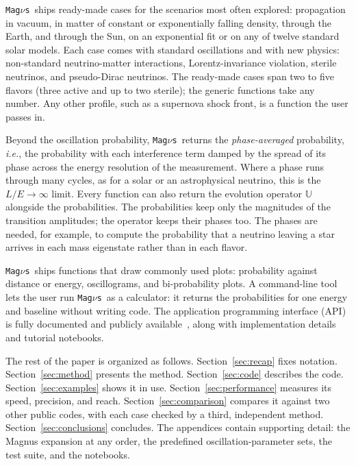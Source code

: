 \documentclass[final,5p,times,twocolumn,sort,compress]{elsarticle}
\makeatletter
\newcommand{\ie}{{\it i.e.}}
\DeclareRobustCommand{\_}{%
  \ifmmode\nfss@text{\textunderscore}\else\textunderscore\allowbreak\fi}
\newcommand{\magnus}{{\tt Mag}\ensuremath{\nu}{\tt s}}
\makeatother
\begin{document}
\magnus\ ships ready-made cases for the scenarios most often explored: propagation in vacuum, in matter of constant or exponentially falling density, through the Earth, and through the Sun, on an exponential fit or on any of twelve standard solar models. Each case comes with standard oscillations and with new physics: non-standard neutrino-matter interactions, Lorentz-invariance violation, sterile neutrinos, and pseudo-Dirac neutrinos. The ready-made cases span two to five flavors (three active and up to two sterile); the generic functions take any number. Any other profile, such as a supernova shock front, is a function the user passes in.

Beyond the oscillation probability, \magnus\ returns the \emph{phase-averaged} probability, \ie, the probability with each interference term damped by the spread of its phase across the energy resolution of the measurement. Where a phase runs through many cycles, as for a solar or an astrophysical neutrino, this is the $L/E \to \infty$ limit. Every function can also return the evolution operator $\mathbb{U}$ alongside the probabilities. The probabilities keep only the magnitudes of the transition amplitudes; the operator keeps their phases too. The phases are needed, for example, to compute the probability that a neutrino leaving a star arrives in each mass eigenstate rather than in each flavor.

\magnus\ ships functions that draw commonly used plots: probability against distance or energy, oscillograms, and bi-probability plots. A command-line tool lets the user run \magnus\ as a calculator: it returns the probabilities for one energy and baseline without writing code. The application programming interface (API) is fully documented and publicly available~\cite{MagnusDocs}, along with implementation details and tutorial notebooks.

The rest of the paper is organized as follows. Section~\ref{sec:recap} fixes notation. Section~\ref{sec:method} presents the method. Section~\ref{sec:code} describes the code. Section~\ref{sec:examples} shows it in use. Section~\ref{sec:performance} measures its speed, precision, and reach. Section~\ref{sec:comparison} compares it against two other public codes, with each case checked by a third, independent method. Section~\ref{sec:conclusions} concludes. The appendices contain supporting detail: the Magnus expansion at any order, the predefined oscillation-parameter sets, the test suite, and the notebooks.

\end{document}
